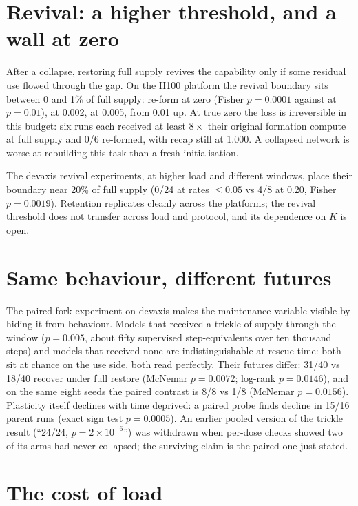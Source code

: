 \documentclass{article}
\begin{document}
\section{Revival: a higher threshold, and a wall at zero}
\label{sec:revival}

After a collapse, restoring full supply revives the capability only if some residual use
flowed through the gap. On the H100 platform the revival boundary sits between 0 and 1\% of
full supply: \RevZero{} re-form at zero (Fisher $p=0.0001$ against \RevOne{} at $p=0.01$),
\RevTwoTh{} at 0.002, \RevFiveTh{} at 0.005, \RevOne{} from 0.01 up. At true zero the loss
is irreversible in this budget: six runs each received at least $8\times$ their original
formation compute at full supply and 0/6 re-formed, with recap still at 1.000. A collapsed
network is worse at rebuilding this task than a fresh initialisation.

The devaxis revival experiments, at higher load and different windows, place their boundary
near 20\% of full supply (0/24 at rates $\le 0.05$ vs 4/8 at 0.20, Fisher $p=0.0019$).
Retention replicates cleanly across the platforms; the revival threshold does not transfer
across load and protocol, and its dependence on $K$ is open.

\section{Same behaviour, different futures}
\label{sec:futures}

The paired-fork experiment on devaxis makes the maintenance variable visible by hiding it
from behaviour. Models that received a trickle of supply through the window ($p=0.005$, about
fifty supervised step-equivalents over ten thousand steps) and models that received none are
indistinguishable at rescue time: both sit at chance on the use side, both read perfectly.
Their futures differ: 31/40 vs 18/40 recover under full restore (McNemar $p=0.0072$;
log-rank $p=0.0146$), and on the same eight seeds the paired contrast is 8/8 vs 1/8 (McNemar
$p=0.0156$). Plasticity itself declines with time deprived: a paired probe finds decline in
15/16 parent runs (exact sign test $p=0.0005$). An earlier pooled version of the trickle result
(``24/24, $p=2\times10^{-6}$'') was withdrawn when per-dose checks showed two of its arms
had never collapsed; the surviving claim is the paired one just stated.

\section{The cost of load}
\label{sec:costload}
\end{document}
